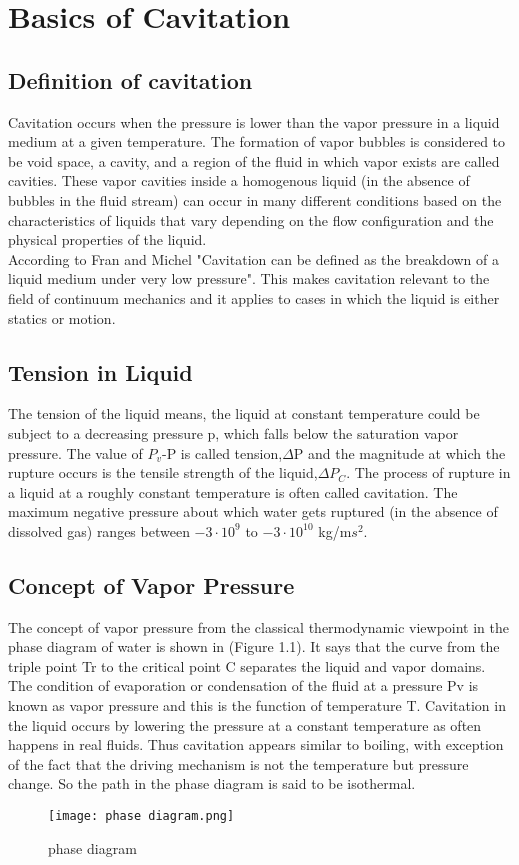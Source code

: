 \chapter{Basics of Cavitation}
\label{chap:chapter1}
\section{Definition of cavitation}
Cavitation occurs when the pressure is lower than the vapor pressure in a liquid medium at a given temperature. The formation of vapor bubbles is considered to be void space, 
a cavity, and a region of the fluid in which vapor exists are called cavities. These vapor cavities inside a homogenous liquid (in the absence of bubbles in the fluid stream) can occur in many different conditions based on
the characteristics of liquids that vary depending on the flow configuration and the physical properties of the liquid.\\

According to Fran and Michel\cite{FundamentalsofCavitation.2004}  "Cavitation can be defined as the breakdown of a liquid medium under very low pressure".
This makes cavitation relevant to the field of continuum mechanics and it applies to cases in which the liquid  is either statics or motion.
 \\
\section{Tension in Liquid}
The tension of the liquid means, the liquid at 
 constant temperature could be subject to a decreasing pressure p, which falls below the saturation vapor pressure. The value of $P_v$-P is called tension,$\Delta$P and the magnitude at which the rupture
 occurs is the tensile strength of the liquid,$\Delta P_C$. The process of rupture in a liquid at a roughly constant temperature is often called cavitation.
 The maximum negative pressure about which water gets ruptured (in the absence of dissolved gas) ranges between $-3\cdot 10^9$ to $ -3\cdot 10^{10} $ kg/m$s^2$.
\section{Concept of Vapor Pressure} 
 The concept of vapor pressure from the classical thermodynamic viewpoint in the phase diagram of water is shown in (Figure 1.1). It says that the curve from the triple point Tr to the critical point C separates the liquid 
 and vapor domains. The condition of evaporation or condensation of the fluid at a pressure Pv is known as vapor pressure and this is the function of temperature T.
 Cavitation in the liquid occurs by lowering the pressure at a constant temperature as often happens in real fluids. Thus cavitation appears similar to boiling, with exception of the fact that the driving mechanism is not the temperature but 
 pressure change. So the path in the phase diagram is said to be isothermal.\\
 \begin{figure}[H]
    \centering
    \texttt{[image: phase diagram.png]}
    \caption{phase diagram}
    \label{fig:fig1}
\end{figure}

